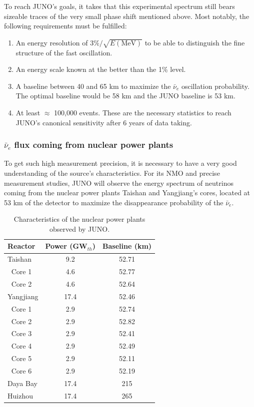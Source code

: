 \documentclass[../main.tex]{subfiles}
\begin{document}
To reach JUNO's goals, it takes that this experimental spectrum still bears sizeable traces of the very small phase shift mentioned above. Most notably, the
following requirements must be fulfilled:
\begin{enumerate}
  \item An energy resolution of $3\%/\sqrt{E\mathrm{(MeV)}}$ to be able to distinguish the fine structure of the fast oscillation.
  \item An energy scale known at the better than the 1\% level.
  \item A baseline between 40 and 65 km to maximize the $\bar{\nu}_e$ oscillation probability. The optimal baseline would be 58 km and the JUNO baseline is 53 km.
  \item At least $\approx$ 100,000 events. These are the necessary statistics to reach JUNO's canonical sensitivity after 6 years of data taking.
\end{enumerate}

\subsubsection{$\bar{\nu}_e$ flux coming from nuclear power plants}
\label{sec:juno:nu_e_flux}

To get such high measurement precision, it is necessary to have a very good understanding of the source's characteristics. For its NMO and precise measurement studies, JUNO will observe the energy spectrum of neutrinos coming from the nuclear power plants Taishan and Yangjiang's cores, located at 53 km of the detector to maximize the disappearance probability of the $\bar{\nu}_e$.

\begin{table}[ht]
  \centering
  \begin{tabular}{l c c}
    \hline
    Reactor & Power (GW$_{th}$) & Baseline (km) \\
    \hline
    Taishan    & 9.2  & 52.71 \\
    $~$ Core 1 & 4.6  & 52.77 \\
    $~$ Core 2 & 4.6  & 52.64 \\
    Yangjiang  & 17.4 & 52.46 \\
    $~$ Core 1 & 2.9  & 52.74 \\
    $~$ Core 2 & 2.9  & 52.82 \\
    $~$ Core 3 & 2.9  & 52.41 \\
    $~$ Core 4 & 2.9  & 52.49 \\
    $~$ Core 5 & 2.9  & 52.11 \\
    $~$ Core 6 & 2.9  & 52.19 \\
    Daya Bay   & 17.4 & 215   \\
    Huizhou    & 17.4 & 265   \\
    \hline
  \end{tabular}
  \caption{Characteristics of the nuclear power plants observed by JUNO.}
  \label{tab:juno:power_plants}
\end{table}
\end{document}
